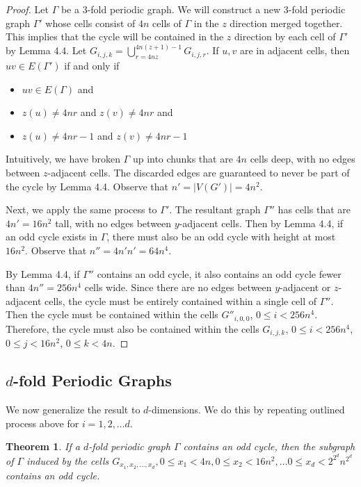 \documentclass[letterpaper]{article}
\newtheorem{theorem}{Theorem}[section]
\begin{document}
\begin{proof}
Let $\Gamma$ be a 3-fold periodic graph.
We will construct a new 3-fold periodic graph $\Gamma'$ whose cells consist of $4n$ cells of $\Gamma$ in the $z$ direction merged together.
This implies that the cycle will be contained in the $z$ direction by each cell of $\Gamma'$ by Lemma 4.4.
Let $G_{i,j,k} = \bigcup_{r=4nz}^{4n(z+1)-1} G_{i,j,r}$.
If $u,v$ are in adjacent cells, then $uv \in E(\Gamma')$ if and only if

\begin{itemize}
    \item $uv \in E(\Gamma)$ and
    \item $z(u) \neq 4nr$ and $z(v) \neq 4nr$ and
    \item $z(u) \neq 4nr-1$ and $z(v) \neq 4nr-1$
\end{itemize}

Intuitively, we have broken $\Gamma$ up into chunks that are $4n$ cells deep, with no edges between $z$-adjacent cells.
The discarded edges are guaranteed to never be part of the cycle by Lemma 4.4.
Observe that $n' = |V(G')| = 4n^2$.

Next, we apply the same process to $\Gamma'$.
The resultant graph $\Gamma''$ has cells that are $4n' = 16n^2$ tall, with no edges between $y$-adjacent cells.
Then by Lemma 4.4, if an odd cycle exists in $\Gamma$, there must also be an odd cycle with height at most $16n^2$.
Observe that $n'' = 4n' n' = 64n^4$.

By Lemma 4.4, if $\Gamma''$ contains an odd cycle, it also contains an odd cycle fewer than $4n'' = 256n^4$ cells wide.
Since there are no edges between $y$-adjacent or $z$-adjacent cells, the cycle must be entirely contained within a single cell of $\Gamma''$.
Then the cycle must be contained within the cells $G''_{i,0,0}$, $0 \leq i < 256n^4$. 
Therefore, the cycle must also be contained within the cells $G_{i,j,k}$, $0 \leq i < 256n^4$, $0 \leq j < 16n^2$, $0 \leq k < 4n$.
\end{proof}

\subsection{$d$-fold Periodic Graphs}
We now generalize the result to $d$-dimensions.
We do this by repeating outlined process above for $i = 1, 2, \ldots d$.

\begin{theorem}
If a $d$-fold periodic graph $\Gamma$ contains an odd cycle, then the subgraph of $\Gamma$ induced by the cells $G_{x_1,x_2,\ldots,x_d}, 0 \leq x_1 < 4n, 0 \leq x_2 < 16n^2, \ldots 0 \leq x_d < 2^{2^d} n^{2^d}$ contains an odd cycle.
\end{theorem}
\end{document}
